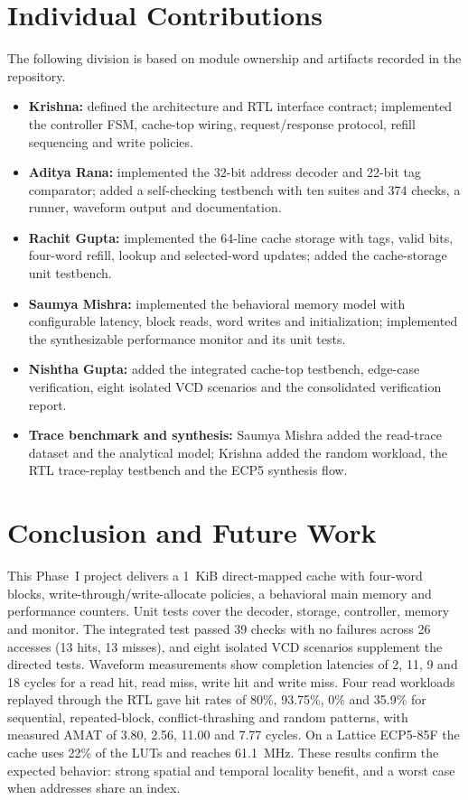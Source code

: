 \documentclass[conference,a4paper]{IEEEtran}
\begin{document}
\section{Individual Contributions}\label{sec:contrib}
The following division is based on module ownership and artifacts recorded in the repository.
\begin{itemize}
\item \textbf{Krishna:} defined the architecture and RTL interface contract; implemented the controller FSM, cache-top wiring, request/response protocol, refill sequencing and write policies.
\item \textbf{Aditya Rana:} implemented the 32-bit address decoder and 22-bit tag comparator; added a self-checking testbench with ten suites and 374 checks, a runner, waveform output and documentation.
\item \textbf{Rachit Gupta:} implemented the 64-line cache storage with tags, valid bits, four-word refill, lookup and selected-word updates; added the cache-storage unit testbench.
\item \textbf{Saumya Mishra:} implemented the behavioral memory model with configurable latency, block reads, word writes and initialization; implemented the synthesizable performance monitor and its unit tests.
\item \textbf{Nishtha Gupta:} added the integrated cache-top testbench, edge-case verification, eight isolated VCD scenarios and the consolidated verification report.
\item \textbf{Trace benchmark and synthesis:} Saumya Mishra added the read-trace dataset and the analytical model; Krishna added the random workload, the RTL trace-replay testbench and the ECP5 synthesis flow.
\end{itemize}

\section{Conclusion and Future Work}\label{sec:concl}
This Phase~I project delivers a 1~KiB direct-mapped cache with four-word blocks, write-through/write-allocate policies, a behavioral main memory and performance counters. Unit tests cover the decoder, storage, controller, memory and monitor. The integrated test passed 39 checks with no failures across 26 accesses (13 hits, 13 misses), and eight isolated VCD scenarios supplement the directed tests. Waveform measurements show completion latencies of 2, 11, 9 and 18 cycles for a read hit, read miss, write hit and write miss. Four read workloads replayed through the RTL gave hit rates of 80\%, 93.75\%, 0\% and 35.9\% for sequential, repeated-block, conflict-thrashing and random patterns, with measured AMAT of 3.80, 2.56, 11.00 and 7.77 cycles. On a Lattice ECP5-85F the cache uses 22\% of the LUTs and reaches 61.1~MHz. These results confirm the expected behavior: strong spatial and temporal locality benefit, and a worst case when addresses share an index.
\end{document}
